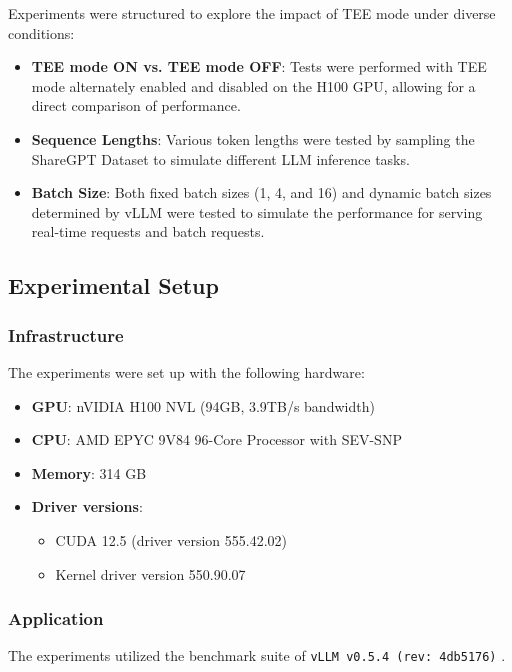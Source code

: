 \documentclass{article}
\begin{document}
Experiments were structured to explore the impact of TEE mode under diverse conditions:
\begin{itemize}
    \item \textbf{TEE mode ON vs. TEE mode OFF}: Tests were performed with TEE mode alternately enabled and disabled on the H100 GPU, allowing for a direct comparison of performance.
    \item \textbf{Sequence Lengths}: Various token lengths were tested by sampling the ShareGPT Dataset \cite{sharegpt} to simulate different LLM inference tasks.
    \item \textbf{Batch Size}: Both fixed batch sizes (1, 4, and 16) and dynamic batch sizes determined by vLLM \cite{kwon2023efficient} were tested to simulate the performance for serving real-time requests and batch requests.
\end{itemize}

\subsection{Experimental Setup}

\subsubsection{Infrastructure}

The experiments were set up with the following hardware:

\begin{itemize}
    \item \textbf{GPU}: nVIDIA H100 NVL (94GB, 3.9TB/s bandwidth)
    \item \textbf{CPU}: AMD EPYC 9V84 96-Core Processor with SEV-SNP
    \item \textbf{Memory}: 314 GB
    \item \textbf{Driver versions}:
          \begin{itemize}
              \item CUDA 12.5 (driver version 555.42.02)
              \item Kernel driver version 550.90.07
          \end{itemize}
\end{itemize}

\subsubsection{Application}

The experiments utilized the benchmark suite of \texttt{vLLM v0.5.4 (rev: 4db5176)} \cite{kwon2023efficient}.
\end{document}
